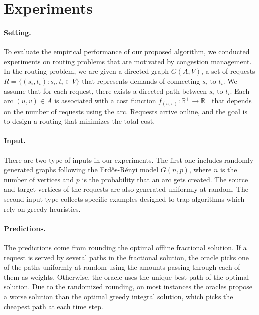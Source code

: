 
\section{Experiments}

\paragraph{Setting.}
To evaluate the empirical performance of our proposed algorithm, we conducted experiments on routing problems
that are motivated by congestion management.
In the routing problem, we are given a directed graph $G(A,V)$, a set of requests $R = \{(s_{i}, t_{i}) : s_{i}, t_{i} \in V\}$ that represents demands of
connecting $s_{i}$ to $t_{i}$. We assume that for each request, there exists a directed path between $s_{i}$ to $t_{i}$.
Each arc $(u, v) \in A$ is associated with a cost function $f_{(u,v)}: \mathbb{R}^{+} \rightarrow \mathbb{R}^{+}$ that depends on the number of requests using the arc.
Requests arrive online, and the goal is to design a routing that minimizes the total cost.


\paragraph{Input.}
There are two type of inputs in our experiments. The first one includes randomly generated graphs following the Erd\H{o}s-Rényi model $G(n, p)$, where $n$ is the number of vertices and $p$ is the probability that an arc gets created. The source and target vertices of the requests are also generated uniformly at random. The second input type collects specific examples designed to trap algorithms which rely on greedy heuristics.


\paragraph{Predictions.}
The predictions come from rounding the optimal offline fractional solution. If a request is served by several paths in the fractional solution, the oracle picks one of the paths uniformly at random using the amounts passing through each of them as weights. Otherwise, the oracle uses the unique best path of the optimal solution. Due to the randomized rounding, on most instances the oracles propose a worse solution than the optimal greedy integral solution, which picks the cheapest path at each time step.


